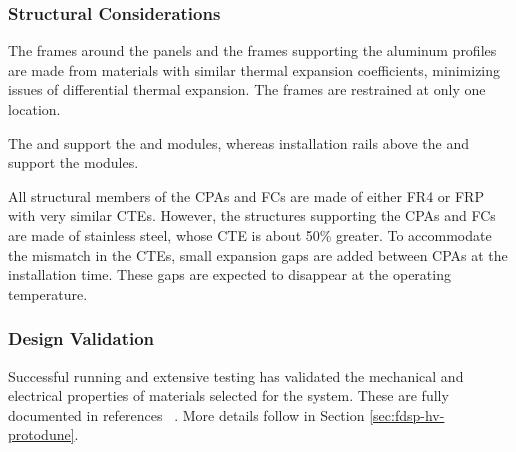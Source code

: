 \subsubsection{Structural Considerations}

The frames around the  panels and the frames supporting the  aluminum profiles  
are made from materials with similar thermal expansion coefficients, minimizing issues of differential thermal expansion. The  frames 
are restrained at only one location.  

The  and  support the  and  modules, whereas
installation rails above the  and  support the  modules. 

All structural members of the CPAs and FCs are made of either FR4 or FRP with very similar CTEs. However, the structures supporting the CPAs and FCs are made of stainless steel, whose CTE is about 50\% greater.  To accommodate the mismatch in the CTEs, small expansion gaps are added between CPAs at the installation time.  These gaps are expected to disappear at the operating temperature.
 
\subsubsection{Design Validation}

Successful  running and extensive testing has %
validated the mechanical and electrical properties of materials selected for the  system.  These are fully documented in references ~\cite{bib:docdb2338, bib:docdb1504, bib:docdb1601}. More details follow in Section \ref{sec:fdsp-hv-protodune}.

